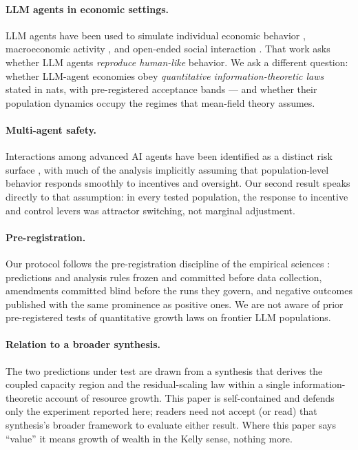 \documentclass{article} %
\newif\ifanon
\begin{document}
\paragraph{LLM agents in economic settings.} LLM agents have been used to simulate individual economic behavior \citep{horton2023}, macroeconomic activity \citep{li2024econagent}, and open-ended social interaction \citep{park2023}. That work asks whether LLM agents \emph{reproduce human-like} behavior. We ask a different question: whether LLM-agent economies obey \emph{quantitative information-theoretic laws} stated in nats, with pre-registered acceptance bands --- and whether their population dynamics occupy the regimes that mean-field theory assumes.

\paragraph{Multi-agent safety.} Interactions among advanced AI agents have been identified as a distinct risk surface \citep{critch2020,hammond2025}, with much of the analysis implicitly assuming that population-level behavior responds smoothly to incentives and oversight. Our second result speaks directly to that assumption: in every tested population, the response to incentive and control levers was attractor switching, not marginal adjustment.

\paragraph{Pre-registration.} Our protocol follows the pre-registration discipline of the empirical sciences \citep{nosek2018}: predictions and analysis rules frozen and committed before data collection, amendments committed blind before the runs they govern, and negative outcomes published with the same prominence as positive ones. We are not aware of prior pre-registered tests of quantitative growth laws on frontier LLM populations.

\ifanon
\paragraph{Relation to a broader synthesis.} The two predictions under test are drawn from a synthesis \citep{qian2026} that derives the coupled capacity region and the residual-scaling law within a single information-theoretic account of resource growth. This paper is self-contained and defends only the experiment reported here; readers need not accept (or read) that synthesis's broader framework to evaluate either result. Where this paper says ``value'' it means growth of wealth in the Kelly sense, nothing more.
\else
\end{document}
